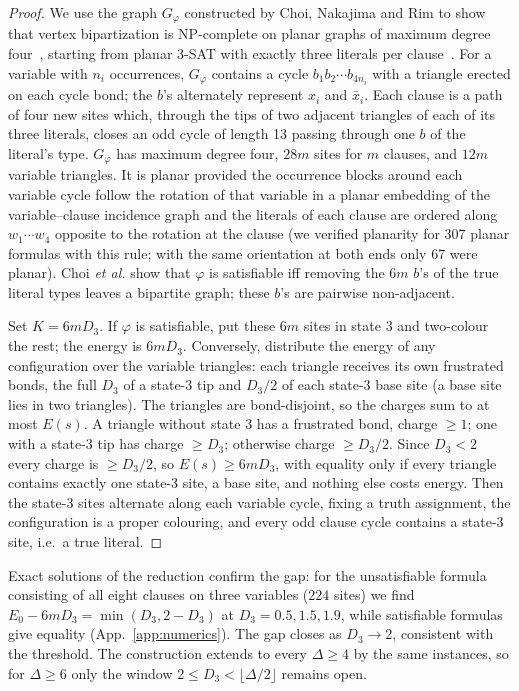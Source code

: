 \documentclass[aps,pre,twocolumn,superscriptaddress,showpacs]{revtex4-2}
\theoremstyle{definition}
\theoremstyle{remark}
\newcommand{\OPT}{E_0}
\begin{document}
\begin{proof}
We use the graph $G_\varphi$ constructed by Choi, Nakajima and Rim to show that vertex
bipartization is NP-complete on planar graphs of maximum degree four~\cite{Choi1989}, starting from
planar 3-SAT with exactly three literals per clause~\cite{Lichtenstein1982}. For a variable with
$n_i$ occurrences, $G_\varphi$ contains a cycle $b_1b_2\cdots b_{4n_i}$ with a triangle erected on
each cycle bond; the $b$'s alternately represent $x_i$ and $\bar x_i$. Each clause is a path
of four new sites which, through the tips of two adjacent triangles of each of its three
literals, closes an odd cycle of length 13 passing through one $b$ of the literal's type.
$G_\varphi$ has maximum degree four, $28m$ sites for $m$ clauses, and $12m$ variable
triangles. It is planar provided the occurrence blocks around each variable cycle follow the
rotation of that variable in a planar embedding of the variable--clause incidence graph and the
literals of each clause are ordered along $w_1\cdots w_4$ opposite to the rotation at the clause
(we verified planarity for 307 planar formulas with this rule; with the same orientation at both
ends only 67 were planar). Choi \emph{et al.} show that $\varphi$ is satisfiable iff removing the $6m$ $b$'s of the
true literal types leaves a bipartite graph; these $b$'s are pairwise non-adjacent.

Set $K=6mD_3$. If $\varphi$ is satisfiable, put these $6m$ sites in state 3 and two-colour the rest;
the energy is $6mD_3$. Conversely, distribute the energy of any configuration over the variable
triangles: each triangle receives its own frustrated bonds, the full $D_3$ of a state-3 tip and
$D_3/2$ of each state-3 base site (a base site lies in two triangles). The triangles are
bond-disjoint, so the charges sum to at most $E(s)$. A triangle without state 3 has a frustrated
bond, charge $\ge1$; one with a state-3 tip has charge $\ge D_3$; otherwise charge $\ge D_3/2$.
Since $D_3<2$ every charge is $\ge D_3/2$, so $E(s)\ge6mD_3$, with equality only if every triangle
contains exactly one state-3 site, a base site, and nothing else costs energy. Then the state-3
sites alternate along each variable cycle, fixing a truth assignment, the configuration is a
proper colouring, and every odd clause cycle contains a state-3 site, i.e.\ a true literal.
\end{proof}

Exact solutions of the reduction confirm the gap: for the unsatisfiable formula consisting of all
eight clauses on three variables ($224$ sites) we find $\OPT-6mD_3=\min(D_3,2-D_3)$ at
$D_3=0.5,1.5,1.9$, while satisfiable formulas give equality (App.~\ref{app:numerics}). The gap
closes as $D_3\to2$, consistent with the threshold. The construction extends to every
$\Delta\ge4$ by the same instances, so for $\Delta\ge6$ only the window
$2\le D_3<\lfloor\Delta/2\rfloor$ remains open.
\end{document}
